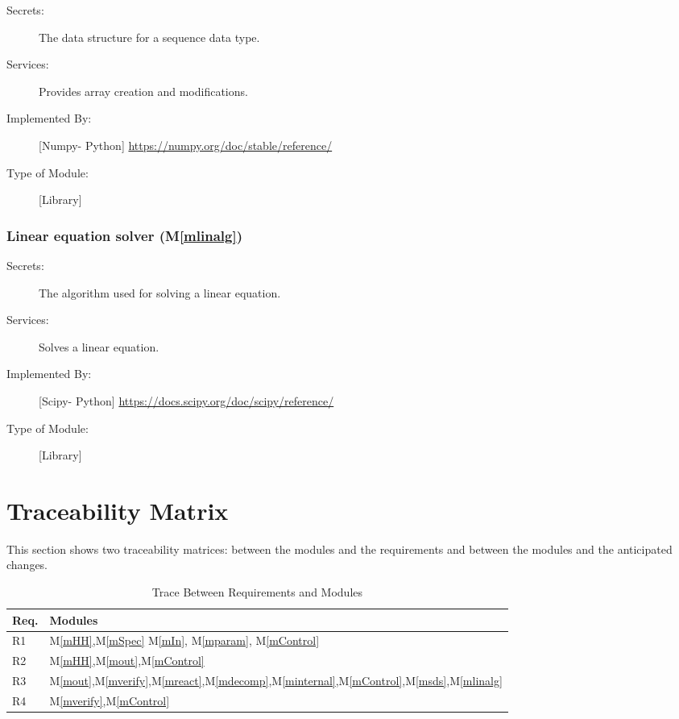 \documentclass[12pt, titlepage]{article}
\newcommand{\mref}[1]{M\ref{#1}}
\begin{document}
\begin{description}
\item[Secrets:]The data structure  for a sequence data type.
\item[Services:] Provides array creation and modifications.
\item[Implemented By:] [Numpy- Python] \url{https://numpy.org/doc/stable/reference/}
\item[Type of Module:] [Library]

 
\end{description}
\subsubsection{Linear equation solver (\mref{mlinalg})}

\begin{description}
\item[Secrets:]The algorithm used for solving a linear equation.
\item[Services:] Solves a linear equation.
\item[Implemented By:] [Scipy- Python] \url{https://docs.scipy.org/doc/scipy/reference/}
\item[Type of Module:] [Library]
  
\end{description}

\section{Traceability Matrix} \label{SecTM}

This section shows two traceability matrices: between the modules and the
requirements and between the modules and the anticipated changes.

\begin{table}[H]
\centering
\begin{tabular}{p{} p{}}
\toprule
\textbf{Req.} & \textbf{Modules}\\
\midrule
R1 & \mref{mHH},\mref{mSpec} \mref{mIn}, \mref{mparam}, \mref{mControl}\\
R2 & \mref{mHH},\mref{mout},\mref{mControl}\\
R3 & \mref{mout},\mref{mverify},\mref{mreact},\mref{mdecomp},\mref{minternal},\mref{mControl},\mref{msds},\mref{mlinalg}\\
R4 & \mref{mverify},\mref{mControl} \\

\bottomrule
\end{tabular}
\caption{Trace Between Requirements and Modules}
\label{TblRT}
\end{table}
\end{document}
